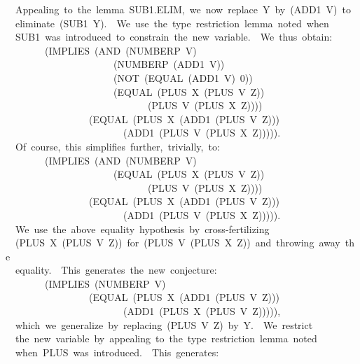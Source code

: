 \documentclass[11pt]{book}
\newenvironment{pubasis}{\begin{flushleft}\ttfamily\small}{\normalsize\rmfamily\end{flushleft}}
\begin{document}
\begin{pubasis}
~~Appealing~to~the~lemma~SUB1.ELIM,~we~now~replace~Y~by~(ADD1~V)~to\\
~~eliminate~(SUB1~Y).~~We~use~the~type~restriction~lemma~noted~when\\
~~SUB1~was~introduced~to~constrain~the~new~variable.~~We~thus~obtain:\\

~~~~~~~~(IMPLIES~(AND~(NUMBERP~V)\\
~~~~~~~~~~~~~~~~~~~~~~(NUMBERP~(ADD1~V))\\
~~~~~~~~~~~~~~~~~~~~~~(NOT~(EQUAL~(ADD1~V)~0))\\
~~~~~~~~~~~~~~~~~~~~~~(EQUAL~(PLUS~X~(PLUS~V~Z))\\
~~~~~~~~~~~~~~~~~~~~~~~~~~~~~(PLUS~V~(PLUS~X~Z))))\\
~~~~~~~~~~~~~~~~~(EQUAL~(PLUS~X~(ADD1~(PLUS~V~Z)))\\
~~~~~~~~~~~~~~~~~~~~~~~~(ADD1~(PLUS~V~(PLUS~X~Z))))).\\

~~Of~course,~this~simplifies~further,~trivially,~to:\\

~~~~~~~~(IMPLIES~(AND~(NUMBERP~V)\\
~~~~~~~~~~~~~~~~~~~~~~(EQUAL~(PLUS~X~(PLUS~V~Z))\\
~~~~~~~~~~~~~~~~~~~~~~~~~~~~~(PLUS~V~(PLUS~X~Z))))\\
~~~~~~~~~~~~~~~~~(EQUAL~(PLUS~X~(ADD1~(PLUS~V~Z)))\\
~~~~~~~~~~~~~~~~~~~~~~~~(ADD1~(PLUS~V~(PLUS~X~Z))))).\\

~~We~use~the~above~equality~hypothesis~by~cross-fertilizing\\
~~(PLUS~X~(PLUS~V~Z))~for~(PLUS~V~(PLUS~X~Z))~and~throwing~away~the\\
~~equality.~~This~generates~the~new~conjecture:\\

~~~~~~~~(IMPLIES~(NUMBERP~V)\\
~~~~~~~~~~~~~~~~~(EQUAL~(PLUS~X~(ADD1~(PLUS~V~Z)))\\
~~~~~~~~~~~~~~~~~~~~~~~~(ADD1~(PLUS~X~(PLUS~V~Z))))),\\

~~which~we~generalize~by~replacing~(PLUS~V~Z)~by~Y.~~We~restrict\\
~~the~new~variable~by~appealing~to~the~type~restriction~lemma~noted\\
~~when~PLUS~was~introduced.~~This~generates:\\


\end{pubasis}
\end{document}
